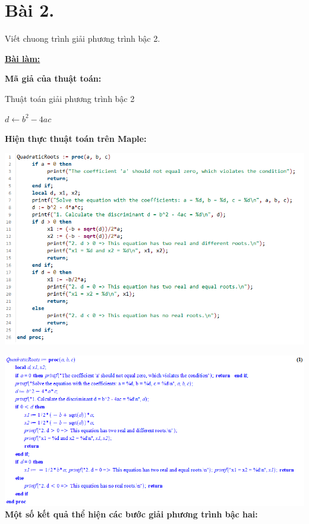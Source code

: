 \section*{Bài 2.}

Viết chuong trình giải phương trình bậc 2.
	

\centering
\textbf{\underline{Bài làm:}}

\justifying
\textbf{Mã giả của thuật toán:}
\begin{algorithm}
\renewcommand{\algorithmcfname}{Thuật toán}

\caption{Thuật toán giải phương trình bậc 2}
\SetAlgoNoEnd\SetAlgoNoLine%

$d \gets b^2 - 4ac$\\
\end{algorithm}


\textbf{Hiện thực thuật toán trên Maple:}

\includegraphics[width=1.0\textwidth]{images/bai2_quadraticroots.png}

\includegraphics[width=1.0\textwidth]{images/bai2_quadraticroots_1.png}
\\[9pt]
\textbf{Một số kết quả thể hiện các bước giải phương trình bậc hai:}

